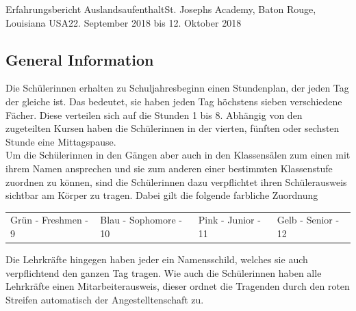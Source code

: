 \documentclass[oneside,openany,headings=optiontotoc,11pt,numbers=noenddot]{article}
\begin{document}
\begin{worksheet}{Erfahrungsbericht Auslandsaufenthalt}{St. Joseph\grq{}s Academy, Baton Rouge, Louisiana USA}{22. September 2018 bis 12. Oktober 2018}
		\subsection{General Information}
		Die Schülerinnen erhalten zu Schuljahresbeginn einen Stundenplan, der jeden Tag der gleiche ist. Das bedeutet, sie haben jeden Tag höchstens sieben verschiedene Fächer. Diese verteilen sich auf die Stunden 1 bis 8. Abhängig von den zugeteilten Kursen haben die Schülerinnen in der vierten, fünften oder sechsten Stunde eine Mittagspause.\\
		Um die Schülerinnen in den Gängen aber auch in den Klassensälen zum einen mit ihrem Namen ansprechen und sie zum anderen einer bestimmten Klassenstufe zuordnen zu können, sind die Schülerinnen dazu verpflichtet ihren Schülerausweis sichtbar am Körper zu tragen. Dabei gilt die folgende farbliche Zuordnung\\
		\begin{tabularx}{\textwidth}{llll}
			Grün - Freshmen - 9 & Blau - Sophomore - 10 & Pink - Junior - 11 & Gelb - Senior - 12
		\end{tabularx}
		Die Lehrkräfte hingegen haben jeder ein Namensschild, welches sie auch verpflichtend den ganzen Tag tragen. Wie auch die Schülerinnen haben alle Lehrkräfte einen \grqq{}Mitarbeiterausweis\grqq{}, dieser ordnet die Tragenden durch den roten Streifen automatisch der Angestelltenschaft zu.

\end{worksheet}
\end{document}
